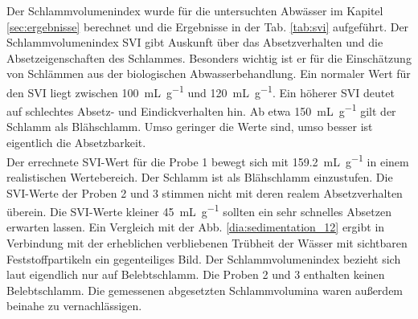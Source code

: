 





Der Schlammvolumenindex wurde für die untersuchten Abwässer im Kapitel \ref{sec:ergebnisse} berechnet und die Ergebnisse in der Tab. \ref{tab:svi} aufgeführt.
Der Schlammvolumenindex SVI gibt Auskunft über das Absetzverhalten und die Absetzeigenschaften des Schlammes. Besonders wichtig ist er für die Einschätzung von Schlämmen aus der biologischen Abwasserbehandlung.\cite{Dr.ManfredNeupert.August2008} 
Ein normaler Wert für den SVI liegt zwischen \SI{100}{\milli\liter\per\gram} und \SI{120}{\milli\liter\per\gram}. Ein höherer SVI deutet auf schlechtes Absetz- und Eindickverhalten hin. Ab etwa \SI{150}{\milli\liter\per\gram} gilt der Schlamm als Blähschlamm. Umso geringer die Werte sind, umso besser ist eigentlich die Absetzbarkeit.\\
Der errechnete SVI-Wert für die Probe 1 bewegt sich mit \SI{159,2}{\milli\liter\per\gram} in einem realistischen Wertebereich. Der Schlamm ist als Blähschlamm einzustufen. Die SVI-Werte der Proben 2 und 3 stimmen nicht mit deren realem Absetzverhalten überein. Die SVI-Werte kleiner \SI{45}{\milli\liter\per\gram} sollten ein sehr schnelles Absetzen erwarten lassen. Ein Vergleich mit der Abb. \ref{dia:sedimentation_12} ergibt in Verbindung mit der erheblichen verbliebenen Trübheit der Wässer mit sichtbaren Feststoffpartikeln ein gegenteiliges Bild. Der Schlammvolumenindex bezieht sich laut \cite{Dr.ManfredNeupert.August2008} eigendlich nur auf Belebtschlamm. Die Proben 2 und 3 enthalten keinen Belebtschlamm. Die gemessenen abgesetzten Schlammvolumina waren außerdem beinahe zu vernachlässigen. \\




